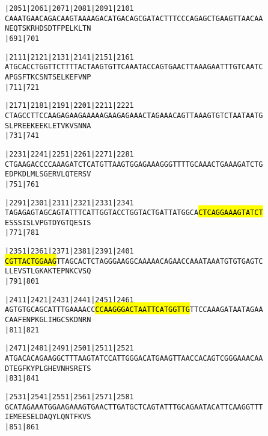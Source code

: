 \documentclass{article}
\begin{document}
\newpage
\begin{alltt}
|2051     |2061     |2071     |2081     |2091     |2101     
CAAATGAACAGACAAGTAAAAGACATGACAGCGATACTTTCCCAGAGCTGAAGTTAACAA
  N  E  Q  T  S  K  R  H  D  S  D  T  F  P  E  L  K  L  T  N
                    |691                          |701      

|2111     |2121     |2131     |2141     |2151     |2161     
ATGCACCTGGTTCTTTTACTAAGTGTTCAAATACCAGTGAACTTAAAGAATTTGTCAATC
  A  P  G  S  F  T  K  C  S  N  T  S  E  L  K  E  F  V  N  P
                    |711                          |721      

|2171     |2181     |2191     |2201     |2211     |2221     
CTAGCCTTCCAAGAGAAGAAAAAGAAGAGAAACTAGAAACAGTTAAAGTGTCTAATAATG
  S  L  P  R  E  E  K  E  E  K  L  E  T  V  K  V  S  N  N  A
                    |731                          |741      

|2231     |2241     |2251     |2261     |2271     |2281     
CTGAAGACCCCAAAGATCTCATGTTAAGTGGAGAAAGGGTTTTGCAAACTGAAAGATCTG
  E  D  P  K  D  L  M  L  S  G  E  R  V  L  Q  T  E  R  S  V
                    |751                          |761      

|2291     |2301     |2311     |2321     |2331     |2341     
TAGAGAGTAGCAGTATTTCATTGGTACCTGGTACTGATTATGGCA\hl{CTCAGGAAAGTATCT}
  E  S  S  S  I  S  L  V  P  G  T  D  Y  G  T  Q  E  S  I  S
                    |771                          |781      

|2351     |2361     |2371     |2381     |2391     |2401     
\hl{CGTTACTGGAAG}TTAGCACTCTAGGGAAGGCAAAAACAGAACCAAATAAATGTGTGAGTC
  L  L  E  V  S  T  L  G  K  A  K  T  E  P  N  K  C  V  S  Q
                    |791                          |801      

|2411     |2421     |2431     |2441     |2451     |2461     
AGTGTGCAGCATTTGAAAACC\hl{CCAAGGGACTAATTCATGGTTG}TTCCAAAGATAATAGAA
  C  A  A  F  E  N  P  K  G  L  I  H  G  C  S  K  D  N  R  N
                    |811                          |821      

|2471     |2481     |2491     |2501     |2511     |2521     
ATGACACAGAAGGCTTTAAGTATCCATTGGGACATGAAGTTAACCACAGTCGGGAAACAA
  D  T  E  G  F  K  Y  P  L  G  H  E  V  N  H  S  R  E  T  S
                    |831                          |841      

|2531     |2541     |2551     |2561     |2571     |2581     
GCATAGAAATGGAAGAAAGTGAACTTGATGCTCAGTATTTGCAGAATACATTCAAGGTTT
  I  E  M  E  E  S  E  L  D  A  Q  Y  L  Q  N  T  F  K  V  S
                    |851                          |861      

\end{alltt}
\end{document}
